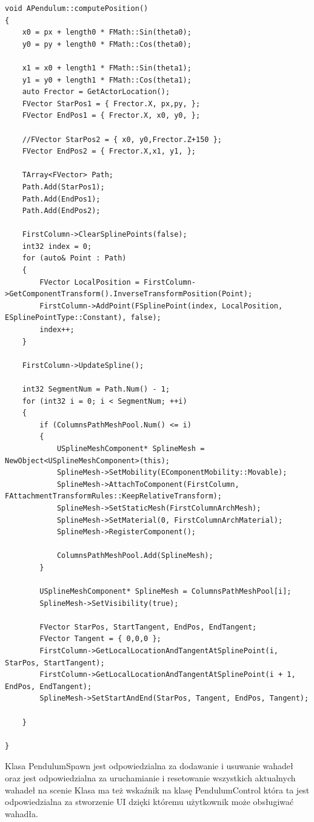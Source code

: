 \documentclass[a4paper,12pt,reqno]{article}
\begin{document}
\begin{lstlisting}
void APendulum::computePosition()
{
	x0 = px + length0 * FMath::Sin(theta0);
	y0 = py + length0 * FMath::Cos(theta0);

	x1 = x0 + length1 * FMath::Sin(theta1);
	y1 = y0 + length1 * FMath::Cos(theta1);
	auto Frector = GetActorLocation();
	FVector StarPos1 = { Frector.X, px,py, };
	FVector EndPos1 = { Frector.X, x0, y0, };

	//FVector StarPos2 = { x0, y0,Frector.Z+150 };
	FVector EndPos2 = { Frector.X,x1, y1, };

	TArray<FVector> Path;
	Path.Add(StarPos1);
	Path.Add(EndPos1);
	Path.Add(EndPos2);

	FirstColumn->ClearSplinePoints(false);
	int32 index = 0;
	for (auto& Point : Path)
	{
		FVector LocalPosition = FirstColumn->GetComponentTransform().InverseTransformPosition(Point);
		FirstColumn->AddPoint(FSplinePoint(index, LocalPosition, ESplinePointType::Constant), false);
		index++;
	}

	FirstColumn->UpdateSpline();

	int32 SegmentNum = Path.Num() - 1;
	for (int32 i = 0; i < SegmentNum; ++i)
	{
		if (ColumnsPathMeshPool.Num() <= i)
		{
			USplineMeshComponent* SplineMesh = NewObject<USplineMeshComponent>(this);
			SplineMesh->SetMobility(EComponentMobility::Movable);
			SplineMesh->AttachToComponent(FirstColumn, FAttachmentTransformRules::KeepRelativeTransform);
			SplineMesh->SetStaticMesh(FirstColumnArchMesh);
			SplineMesh->SetMaterial(0, FirstColumnArchMaterial);
			SplineMesh->RegisterComponent();

			ColumnsPathMeshPool.Add(SplineMesh);
		}

		USplineMeshComponent* SplineMesh = ColumnsPathMeshPool[i];
		SplineMesh->SetVisibility(true);

		FVector StarPos, StartTangent, EndPos, EndTangent;
		FVector Tangent = { 0,0,0 };
		FirstColumn->GetLocalLocationAndTangentAtSplinePoint(i, StarPos, StartTangent);
		FirstColumn->GetLocalLocationAndTangentAtSplinePoint(i + 1, EndPos, EndTangent);
		SplineMesh->SetStartAndEnd(StarPos, Tangent, EndPos, Tangent);

	}

}
\end{lstlisting}

Klasa PendulumSpawn jest odpowiedzialna za dodawanie i usuwanie wahadeł oraz jest odpowiedzialna za uruchamianie i resetowanie wszystkich aktualnych wahadeł na scenie
Klasa ma też wskaźnik na klasę PendulumControl która ta jest odpowiedzialna za stworzenie UI dzięki któremu użytkownik może obsługiwać wahadła.
\end{document}
